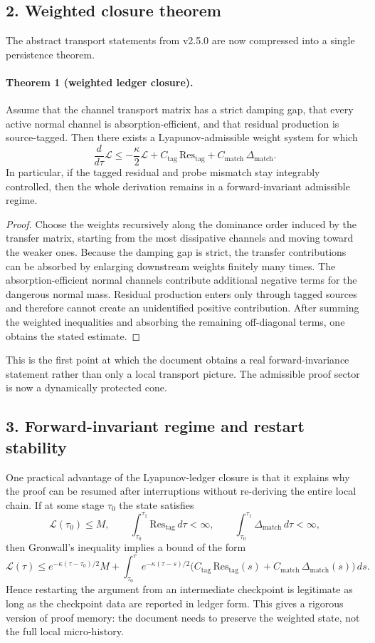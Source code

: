 \subsection*{2. Weighted closure theorem}
The abstract transport statements from v2.5.0 are now compressed into a single
persistence theorem.

\paragraph{Theorem 1 (weighted ledger closure).}
Assume that the channel transport matrix has a strict damping gap, that every active
normal channel is absorption-efficient, and that residual production is source-tagged.
Then there exists a Lyapunov-admissible weight system for which
\[
\frac{d}{d\tau}\mathcal L
\le -\frac{\kappa}{2}\mathcal L
+ C_{\mathrm{tag}}\,\mathrm{Res}_{\mathrm{tag}}
+ C_{\mathrm{match}}\,\Delta_{\mathrm{match}}.
\]
In particular, if the tagged residual and probe mismatch stay integrably controlled,
then the whole derivation remains in a forward-invariant admissible regime.

\begin{proof}
Choose the weights recursively along the dominance order induced by the transfer
matrix, starting from the most dissipative channels and moving toward the weaker
ones. Because the damping gap is strict, the transfer contributions can be absorbed
by enlarging downstream weights finitely many times. The absorption-efficient normal
channels contribute additional negative terms for the dangerous normal mass. Residual
production enters only through tagged sources and therefore cannot create an
unidentified positive contribution. After summing the weighted inequalities and
absorbing the remaining off-diagonal terms, one obtains the stated estimate.
\end{proof}

This is the first point at which the document obtains a real forward-invariance
statement rather than only a local transport picture. The admissible proof sector is
now a dynamically protected cone.

\subsection*{3. Forward-invariant regime and restart stability}
One practical advantage of the Lyapunov-ledger closure is that it explains why the
proof can be resumed after interruptions without re-deriving the entire local chain.
If at some stage $\tau_0$ the state satisfies
\[
\mathcal L(\tau_0)\le M,
\qquad
\int_{\tau_0}^{\tau_1}\mathrm{Res}_{\mathrm{tag}}\,d\tau<\infty,
\qquad
\int_{\tau_0}^{\tau_1}\Delta_{\mathrm{match}}\,d\tau<\infty,
\]
then Gronwall's inequality implies a bound of the form
\[
\mathcal L(\tau)
\le e^{-\kappa(\tau-\tau_0)/2}M
+ \int_{\tau_0}^{\tau}e^{-\kappa(\tau-s)/2}
\bigl(C_{\mathrm{tag}}\,\mathrm{Res}_{\mathrm{tag}}(s)+C_{\mathrm{match}}\,\Delta_{\mathrm{match}}(s)\bigr)\,ds.
\]
Hence restarting the argument from an intermediate checkpoint is legitimate as long
as the checkpoint data are reported in ledger form. This gives a rigorous version of
proof memory: the document needs to preserve the weighted state, not the full local
micro-history.

